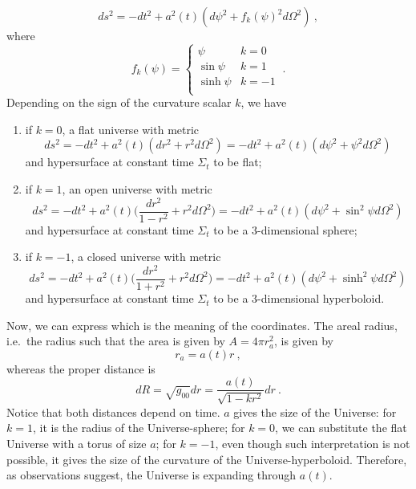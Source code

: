     \begin{equation*}
        ds^2 = - dt^2 + a^2(t) (d\psi^2 + f_k(\psi)^2 d\Omega^2 ) ~, 
    \end{equation*}
    where 
    \begin{equation*}
        f_k(\psi) = \begin{cases}
            \psi & k=0 \\
            \sin \psi & k=1 \\
            \sinh \psi & k=-1 \\
        \end{cases} ~.
    \end{equation*}
    Depending on the sign of the curvature scalar $k$, we have 
    \begin{enumerate}
        \item if $k=0$, a flat universe with metric
            \begin{equation*}
                ds^2 = - dt^2 + a^2(t) (dr^2 + r^2 d\Omega^2 ) = - dt^2 + a^2(t) (d\psi^2 + \psi^2 d\Omega^2 ) 
            \end{equation*}
            and hypersurface at constant time $\Sigma_t$ to be flat;
        \item if $k=1$, an open universe with metric
            \begin{equation*}
                ds^2 = - dt^2 + a^2 (t) \Big ( \frac{dr^2}{1 - r^2} + r^2 d\Omega^2 \Big ) = - dt^2 + a^2(t) (d\psi^2 + \sin^2 \psi d\Omega^2 ) 
            \end{equation*}
            and hypersurface at constant time $\Sigma_t$ to be a $3$-dimensional sphere;
        \item if $k=-1$, a closed universe with metric
            \begin{equation*}
                ds^2 = - dt^2 + a^2 (t) \Big ( \frac{dr^2}{1 + r^2} + r^2 d\Omega^2 \Big ) = - dt^2 + a^2(t) (d\psi^2 + \sinh^2 \psi d\Omega^2 ) 
            \end{equation*}
            and hypersurface at constant time $\Sigma_t$ to be a $3$-dimensional hyperboloid.
    \end{enumerate}
    Now, we can express which is the meaning of the coordinates. The areal radius, i.e.~the radius such that the area is given by $A = 4 \pi r^2_a$, is given by 
    \begin{equation*}
        r_a = a(t) r ~,
    \end{equation*}
    whereas the proper distance is
    \begin{equation*}
        dR = \sqrt{g_{00}} dr = \frac{a(t)}{\sqrt{1 - k r^2}} dr ~.
    \end{equation*}
    Notice that both distances depend on time. $a$ gives the size of the Universe: for $k=1$, it is the radius of the Universe-sphere; for $k=0$, we can substitute the flat Universe with a torus of size $a$; for $k=-1$, even though such interpretation is not possible, it gives the size of the curvature of the Universe-hyperboloid. Therefore, as observations suggest, the Universe is expanding through $a(t)$.

